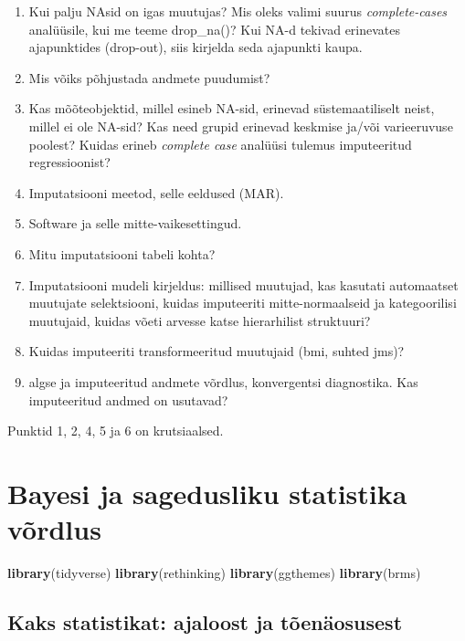 \documentclass[]{book}
\newenvironment{Shaded}{\begin{snugshade}}{\end{snugshade}}
\newcommand{\KeywordTok}[1]{\textcolor[rgb]{0.13,0.29,0.53}{\textbf{#1}}}
\newcommand{\NormalTok}[1]{#1}
\begin{document}
\begin{enumerate}
\def\labelenumi{\arabic{enumi}.}
\item
  Kui palju NAsid on igas muutujas? Mis oleks valimi suurus \emph{complete-cases} analüüsile, kui me teeme drop\_na()? Kui NA-d tekivad erinevates ajapunktides (drop-out), siis kirjelda seda ajapunkti kaupa.
\item
  Mis võiks põhjustada andmete puudumist?
\item
  Kas mõõteobjektid, millel esineb NA-sid, erinevad süstemaatiliselt neist, millel ei ole NA-sid? Kas need grupid erinevad keskmise ja/või varieeruvuse poolest? Kuidas erineb \emph{complete case} analüüsi tulemus imputeeritud regressioonist?
\item
  Imputatsiooni meetod, selle eeldused (MAR).
\item
  Software ja selle mitte-vaikesettingud.
\item
  Mitu imputatsiooni tabeli kohta?
\item
  Imputatsiooni mudeli kirjeldus: millised muutujad, kas kasutati automaatset muutujate selektsiooni, kuidas imputeeriti mitte-normaalseid ja kategoorilisi muutujaid, kuidas võeti arvesse katse hierarhilist struktuuri?
\item
  Kuidas imputeeriti transformeeritud muutujaid (bmi, suhted jms)?
\item
  algse ja imputeeritud andmete võrdlus, konvergentsi diagnostika. Kas imputeeritud andmed on usutavad?
\end{enumerate}

Punktid 1, 2, 4, 5 ja 6 on krutsiaalsed.

\hypertarget{appendix-lisa}{%
\appendix}


\hypertarget{bayesi-ja-sagedusliku-statistika-vordlus}{%
\chapter{Bayesi ja sagedusliku statistika võrdlus}\label{bayesi-ja-sagedusliku-statistika-vordlus}}

\begin{Shaded}
\begin{Highlighting}[]
\KeywordTok{library}\NormalTok{(tidyverse)}
\KeywordTok{library}\NormalTok{(rethinking)}
\KeywordTok{library}\NormalTok{(ggthemes)}
\KeywordTok{library}\NormalTok{(brms)}
\end{Highlighting}
\end{Shaded}

\hypertarget{kaks-statistikat-ajaloost-ja-toenaosusest}{%
\section*{Kaks statistikat: ajaloost ja tõenäosusest}\label{kaks-statistikat-ajaloost-ja-toenaosusest}}
\end{document}
